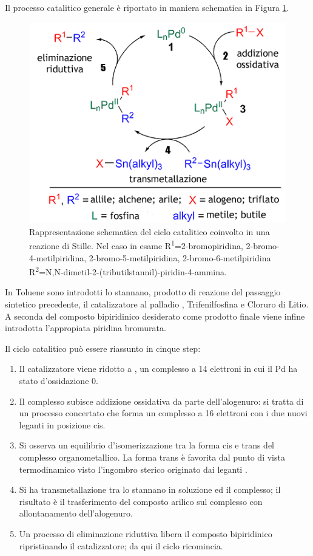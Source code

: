 \documentclass[a4paper, 12pt]{article}
\begin{document}
Il processo catalitico generale è riportato in maniera schematica in Figura \ref{fig:stille}.

\begin{figure}[H]
	\centering
	\includegraphics[width=.9\linewidth]{immagini/stille.png}
	\caption{Rappresentazione schematica del ciclo catalitico coinvolto in una reazione di Stille. Nel caso in esame R\textsuperscript{1}=2-bromopiridina, 2-bromo-4-metilpiridina, 2-bromo-5-metilpiridina, 2-bromo-6-metilpiridina R\textsuperscript{2}=N,N-dimetil-2-(tributilstannil)-piridin-4-ammina.}
	\label{fig:stille}
\end{figure}

In Toluene sono introdotti lo stannano, prodotto di reazione del passaggio sintetico precedente, il catalizzatore al palladio , Trifenilfosfina e Cloruro di Litio. A seconda del composto bipiridinico desiderato come prodotto finale viene infine introdotta l'appropiata piridina bromurata.

Il ciclo catalitico può essere riassunto in cinque step:
\begin{enumerate}
	\item Il catalizzatore  viene ridotto a , un complesso a 14 elettroni in cui il Pd ha stato d'ossidazione 0.
	\item Il complesso subisce addizione ossidativa da parte dell'alogenuro: si tratta di un processo concertato che forma un complesso a 16 elettroni con i due nuovi leganti in posizione cis.
	\item Si osserva un equilibrio d'isomerizzazione tra la forma cis e trans del complesso organometallico. La forma trans è favorita dal punto di vista termodinamico visto l'ingombro sterico originato dai leganti .
	\item Si ha transmetallazione tra lo stannano in soluzione ed il complesso; il risultato è il trasferimento del composto arilico sul complesso con allontanamento dell'alogenuro.
	\item Un processo di eliminazione riduttiva libera il composto bipiridinico ripristinando il catalizzatore; da qui il ciclo ricomincia.
\end{enumerate}
\end{document}
